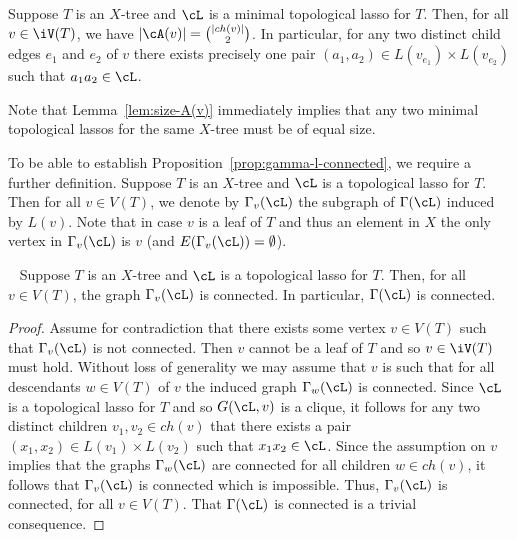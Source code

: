 \begin{lem}\label{lem:size-A(v)}
  Suppose $T$ is an $X$-tree and $\cL$ is a minimal topological lasso for
  $T$. Then, for all $v\in \iV(T)$, we have $|\cA(v)|={|ch(v)|\choose 2}$. In
  particular, for any two distinct child edges $e_1$ and $e_2$ of $v$ there
  exists precisely one pair $(a_1,a_2)\in L(v_{e_1})\times L(v_{e_2})$ such
  that $a_1a_2\in\cL$.
\end{lem}

Note that Lemma~\ref{lem:size-A(v)} immediately implies that any two minimal
topological lassos for the same $X$-tree must be of equal size.

To be able to establish Proposition~\ref{prop:gamma-l-connected}, we require a
further definition.  Suppose $T$ is an $X$-tree and $\cL$ is a topological
lasso for $T$. Then for all $v\in V(T)$, we denote by $\Gamma_v(\cL)$ the
subgraph of $\Gamma(\cL)$ induced by $L(v)$. Note that in case $v$ is a leaf
of $T$ and thus an element in $X$ the only vertex in $\Gamma_v(\cL)$ is $v$
(and $E(\Gamma_v(\cL))=\emptyset$).


\begin{pro}~\label{prop:gamma-l-connected} Suppose $T$ is an $X$-tree and
  $\cL$ is a topological lasso for $T$.  Then, for all $v\in V(T)$, the graph
  $\Gamma_v(\cL)$ is connected.  In particular, $\Gamma(\cL)$ is connected.
\end{pro}
\begin{proof}
  Assume for contradiction that there exists some vertex $v\in V(T)$ such that
  $\Gamma_v(\cL)$ is not connected. Then $v$ cannot be a leaf of $T$ and so
  $v\in \iV(T)$ must hold. Without loss of generality we may assume that $v$
  is such that for all descendants $w\in V(T)$ of $v$ the induced graph
  $\Gamma_w(\cL)$ is connected. Since $\cL$ is a topological lasso for $T$ and
  so $G(\cL,v)$ is a clique, it follows for any two distinct children
  $v_1,v_2\in ch(v)$ that there exists a pair $(x_1,x_2)\in L(v_1)\times
  L(v_2)$ such that $x_1x_2\in \cL$.  Since the assumption on $v$ implies that
  the graphs $\Gamma_{w}(\cL)$ are connected for all children $w\in ch(v)$, it
  follows that $\Gamma_v(\cL)$ is connected which is impossible.  Thus,
  $\Gamma_v(\cL)$ is connected, for all $v\in V(T)$.  That $\Gamma(\cL)$ is
  connected is a trivial consequence.  \qquad
\end{proof}



